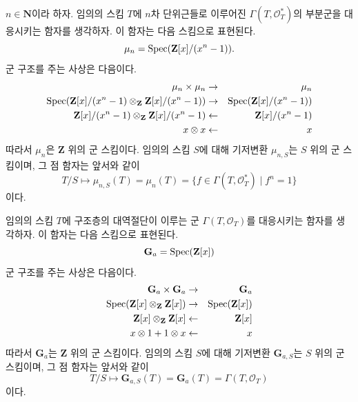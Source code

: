 \begin{example}[1의 거듭제곱근]
\label{example-roots-of-unity}
$n \in \mathbf{N}$이라 하자. 임의의 스킴 $T$에 $n$차 단위근들로 이루어진
$\Gamma(T, \mathcal{O}_T^*)$의 부분군을 대응시키는 함자를 생각하자. 이 함자는 다음 스킴으로 표현된다.
$$
\mu_n = \mathop{\mathrm{Spec}}(\mathbf{Z}[x]/(x^n - 1)).
$$
군 구조를 주는 사상은 다음이다.
\begin{eqnarray*}
\mu_n \times \mu_n & \to & \mu_n \\
\mathop{\mathrm{Spec}}(
\mathbf{Z}[x]/(x^n - 1)
\otimes_{\mathbf{Z}}
\mathbf{Z}[x]/(x^n - 1))
& \to &
\mathop{\mathrm{Spec}}(\mathbf{Z}[x]/(x^n - 1)) \\
\mathbf{Z}[x]/(x^n - 1) \otimes_{\mathbf{Z}} \mathbf{Z}[x]/(x^n - 1)
& \leftarrow &
\mathbf{Z}[x]/(x^n - 1) \\
x \otimes x & \leftarrow & x
\end{eqnarray*}
따라서 $\mu_n$은 $\mathbf{Z}$ 위의 군 스킴이다. 임의의 스킴 $S$에 대해 기저변환
$\mu_{n, S}$는 $S$ 위의 군 스킴이며, 그 점 함자는 앞서와 같이
$$
T/S
\longmapsto
\mu_{n, S}(T) = \mu_n(T) = \{f \in \Gamma(T, \mathcal{O}_T^*) \mid f^n = 1\}
$$
이다.
\end{example}


\begin{example}[덧셈군 스킴]
\label{example-additive-group}
임의의 스킴 $T$에 구조층의 대역절단이 이루는 군
$\Gamma(T, \mathcal{O}_T)$를 대응시키는 함자를 생각하자. 이 함자는 다음 스킴으로 표현된다.
$$
\mathbf{G}_a = \mathop{\mathrm{Spec}}(\mathbf{Z}[x])
$$
군 구조를 주는 사상은 다음이다.
\begin{eqnarray*}
\mathbf{G}_a \times \mathbf{G}_a & \to & \mathbf{G}_a \\
\mathop{\mathrm{Spec}}(\mathbf{Z}[x] \otimes_{\mathbf{Z}} \mathbf{Z}[x])
& \to &
\mathop{\mathrm{Spec}}(\mathbf{Z}[x]) \\
\mathbf{Z}[x] \otimes_{\mathbf{Z}} \mathbf{Z}[x]
& \leftarrow &
\mathbf{Z}[x] \\
x \otimes 1 + 1 \otimes x & \leftarrow & x
\end{eqnarray*}
따라서 $\mathbf{G}_a$는 $\mathbf{Z}$ 위의 군 스킴이다. 임의의 스킴 $S$에 대해 기저변환
$\mathbf{G}_{a, S}$는 $S$ 위의 군 스킴이며, 그 점 함자는 앞서와 같이
$$
T/S
\longmapsto
\mathbf{G}_{a, S}(T) = \mathbf{G}_a(T) = \Gamma(T, \mathcal{O}_T)
$$
이다.
\end{example}

